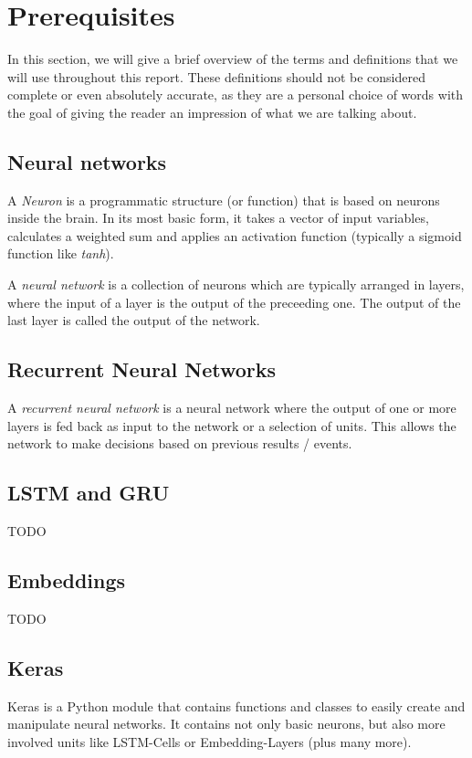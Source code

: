 \section{Prerequisites}
\label{sec:prerequisites}

  In this section, we will give a brief overview of the terms and definitions
  that we will use throughout this report. These definitions should not be
  considered complete or even absolutely accurate, as they are a personal
  choice of words with the goal of giving the reader an impression of what
  we are talking about.

  \subsection{Neural networks}
  \label{sub:neural_networks}
  
    A \textit{Neuron} is a programmatic structure (or function) that is based
    on neurons inside the brain. In its most basic form, it takes a vector of
    input variables, calculates a weighted sum and applies an activation function
    (typically a sigmoid function like \textit{tanh}).

    A \textit{neural network} is a collection of neurons which are typically
    arranged in layers, where the input of a layer is the output of the
    preceeding one. The output of the last layer is called the output of
    the network.

  \subsection{Recurrent Neural Networks}
  \label{sub:recurrent_neural_networks}
  
    A \textit{recurrent neural network} is a neural network where the
    output of one or more layers is fed back as input to the network
    or a selection of units. This allows the network to make decisions
    based on previous results / events.

  \subsection{LSTM and GRU}
  \label{sub:lstm_and_gru}
  
    TODO

  \subsection{Embeddings}
  \label{sub:embeddings}
  
    TODO

  \subsection{Keras}
  \label{sub:keras}
  
    Keras is a Python module that contains functions and classes to easily create
    and manipulate neural networks. It contains not only basic neurons, but
    also more involved units like LSTM-Cells or Embedding-Layers (plus
    many more).

